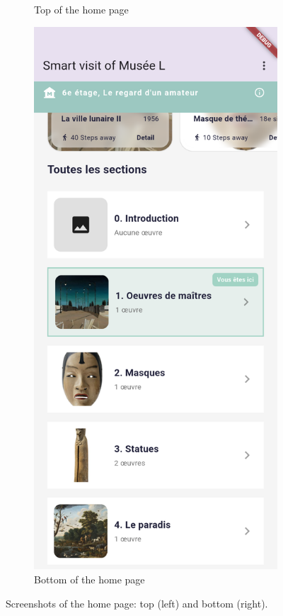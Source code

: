 \begin{figure}[h]
\begin{subfigure}[b]{0.33\linewidth}
        \caption{Top of the home page}
        \label{fig:app-homepage-top}
    \end{subfigure}
    \hspace{3em} %
    \begin{subfigure}[b]{0.33\linewidth}
        \includegraphics[width=\linewidth]{assets/application-homepage-bottom.png}
        \caption{Bottom of the home page}
        \label{fig:app-homepage-bottom}
    \end{subfigure}
    \caption{Screenshots of the home page: top (left) and bottom (right).}
    \label{fig:app-homepage}
\end{figure}

